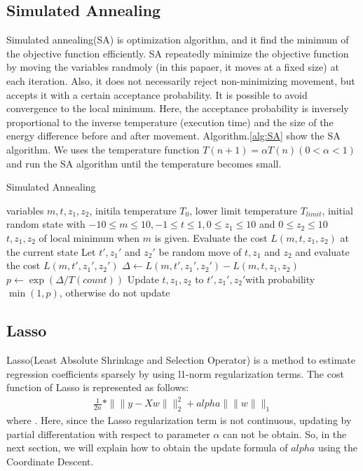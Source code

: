\documentclass[fp,twocolumn]{jpsj3}
\begin{document}
\subsection{Simulated Annealing} %
Simulated annealing(SA) is optimization algorithm, and it find the minimum of the objective function efficiently. SA repeatedly minimize the objective function by moving the variables randmoly (in this papaer, it moves at a fixed size) at each iteration. Also, it does not necessarily reject non-minimizing movement, but accepts it with a certain acceptance probability. It is possible to avoid convergence to the local minimum. Here, the acceptance probability is inversely proportional to the inverse temperature (execution time) and the size of the energy difference before and after movement. Algorithm.\ref{alg:SA} show the SA algorithm. We uses the temperature function $T(n+1)=\alpha T(n) (0<\alpha <1)$ and run the SA algorithm until the temperature becomes small.

\begin{algorithm}
  \caption{Simulated Annealing}
  \begin{algorithmic}[1]
    \REQUIRE variables $m, t, z_{1}, z_{2}$, initila temperature $T_{0}$, lower limit temperature $T_{limit}$, initial random state with $-10\leq m\leq 10, -1\leq t\leq 1, 0\leq z_{1}\leq 10$ and $0\leq z_{2}\leq 10$ 
    \ENSURE  $t, z_{1}, z_{2}$ of local minimum when $m$ is given.
    \STATE Evaluate the cost $L(m, t, z_{1}, z_{2})$ at the current state
    \STATE Let $t', z_{1}'$ and $z_{2}'$ be random move of $t,z_{1}$ and $z_{2}$ and evaluate the cost $L(m,t',z_{1}', z_{2}')$
    \STATE $\Delta \leftarrow L(m,t',z_{1}',z_{2}') - L(m,t,z_{1},z_{2})$
    \STATE $p\leftarrow \exp{(\Delta /T(count))}$
    \STATE Update $t,z_{1},z_{2}$ to $t',z_{1}',z_{2}'$with probability $\min{(1,p)}$, otherwise do not update
    \ENDFOR
  \end{algorithmic}
  \label{alg:SA}
\end{algorithm}

\subsection{Lasso}
Lasso(Least Absolute Shrinkage and Selection Operator) is a method to estimate regression coefficients sparsely by using l1-norm regularization terms. The cost function of Lasso is represented as follows:
\begin{eqnarray}
  \frac{1}{2n}*\|\|y-Xw\|\|^{2}_{2} + alpha\|\|w\|\|_{1}
\end{eqnarray}
where $ $. Here, since the Lasso regularization term is not continuous, updating by partial differentation with respect to parameter $\alpha$ can not be obtain. So, in the next section, we will explain how to obtain the update formula of $alpha$ using the Coordinate Descent.
\end{document}
